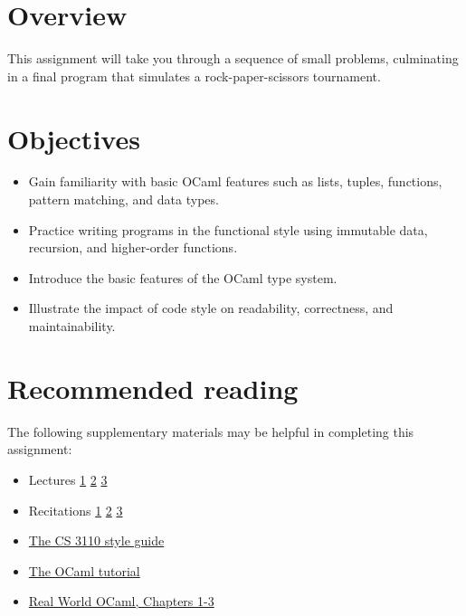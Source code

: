 \documentclass{pset}
\date{Thursday, February 6}
\begin{document}
\maketitle

\section*{Overview}

This assignment will take you through a sequence of small problems,
culminating in a final program that simulates a rock-paper-scissors
tournament.

\section*{Objectives}

\begin{itemize}
\item{} Gain familiarity with basic OCaml features such as lists,
  tuples, functions, pattern matching, and data types.
\item{} Practice writing programs in the functional style using
  immutable data, recursion, and higher-order functions.
\item{} Introduce the basic features of the OCaml type system.
\item{} Illustrate the impact of code style on readability,
  correctness, and maintainability.
\end{itemize}

\section*{Recommended reading}

The following supplementary materials may be helpful in completing
this assignment:
\begin{itemize}
  \item{} Lectures \href{http://www.cs.cornell.edu/Courses/cs3110/2014sp/lectures/1/lec01.pdf}{1}
    \href{http://www.cs.cornell.edu/Courses/cs3110/2014sp/lectures/2/lec02.html}{2}
    \href{http://www.cs.cornell.edu/Courses/cs3110/2014sp/lectures/3/lec03.html}{3}
\item{} Recitations 
  \href{http://www.cs.cornell.edu/Courses/cs3110/2014sp/recitations/1/rec01.html}{1}
  \href{http://www.cs.cornell.edu/Courses/cs3110/2014sp/recitations/2/tuples_records_data.html}{2}
  \href{http://www.cs.cornell.edu/Courses/cs3110/2014sp/recitations/3/rec03.html}{3}
\item{} \href{http://www.cs.cornell.edu/Courses/cs3110/2014sp/handouts/style.html}{The CS 3110 style guide}
\item{} \href{http://ocaml.org/learn/tutorials/}{The OCaml tutorial}
\item{} \href{https://realworldocaml.org/v1/en/html/index.html}{Real World OCaml, Chapters 1-3}
\end{itemize}
\end{document}
